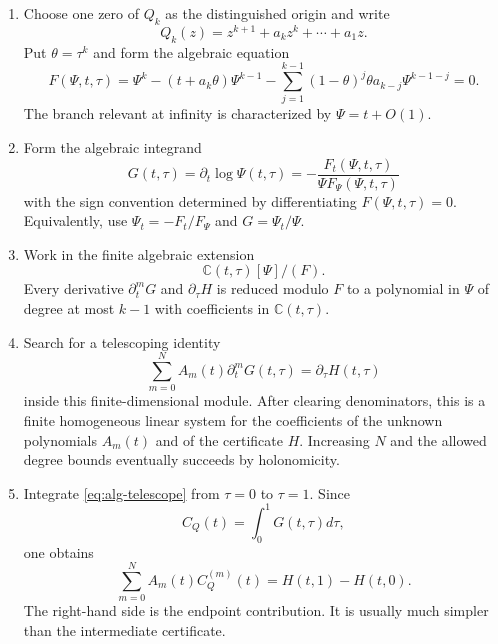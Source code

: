 \documentclass[10pt,twoside,a4paper,reqno]{amsart}
\theoremstyle{plain}
\theoremstyle{definition}
\theoremstyle{remark}
\begin{document}
\begin{enumerate}
\item Choose one zero of $Q_k$ as the distinguished origin and write
\[
        Q_k(z)=z^{k+1}+a_kz^k+\cdots+a_1z .
\]
Put $\theta=\tau^k$ and form the algebraic equation
\begin{equation}\label{eq:alg-psi}
        F(\Psi,t,\tau)=
        \Psi^k-(t+a_k\theta)\Psi^{k-1}
        -\sum_{j=1}^{k-1}(1-\theta)^j\theta a_{k-j}\Psi^{k-1-j}=0 .
\end{equation}
The branch relevant at infinity is characterized by $\Psi=t+O(1)$.

\smallskip
\item Form the algebraic integrand
\begin{equation}\label{eq:alg-integrand}
        G(t,\tau)=\partial_t\log\Psi(t,\tau)
        =-\frac{F_t(\Psi,t,\tau)}{\Psi F_\Psi(\Psi,t,\tau)}
\tag{*}
\end{equation}
with the sign convention determined by differentiating $F(\Psi,t,\tau)=0$.  Equivalently, use $\Psi_t=-F_t/F_\Psi$ and $G=\Psi_t/\Psi$.

\smallskip
\item Work in the finite algebraic extension
\[
        \mathbb C(t,\tau)[\Psi]/(F).
\]
Every derivative $\partial_t^mG$ and $\partial_\tau H$ is reduced modulo $F$ to a polynomial in $\Psi$ of degree at most $k-1$ with coefficients in $\mathbb C(t,\tau)$.

\smallskip
\item Search for a telescoping identity
\begin{equation}\label{eq:alg-telescope}
        \sum_{m=0}^N A_m(t)\partial_t^mG(t,\tau)=\partial_\tau H(t,\tau)
\end{equation}
inside this finite-dimensional module.  After clearing denominators, this is a finite homogeneous linear system for the coefficients of the unknown polynomials $A_m(t)$ and of the certificate $H$.  Increasing $N$ and the allowed degree bounds eventually succeeds by holonomicity.

\item Integrate \eqref{eq:alg-telescope} from $\tau=0$ to $\tau=1$.  Since
\[
        C_Q(t)=\int_0^1G(t,\tau)d\tau,
\]
one obtains
\begin{equation}\label{eq:alg-final-ode}
        \sum_{m=0}^N A_m(t) C_Q^{(m)}(t)=H(t,1)-H(t,0).
\end{equation}
The right-hand side is the endpoint contribution.  It is usually much simpler than the intermediate certificate.
\end{enumerate}
\end{document}
